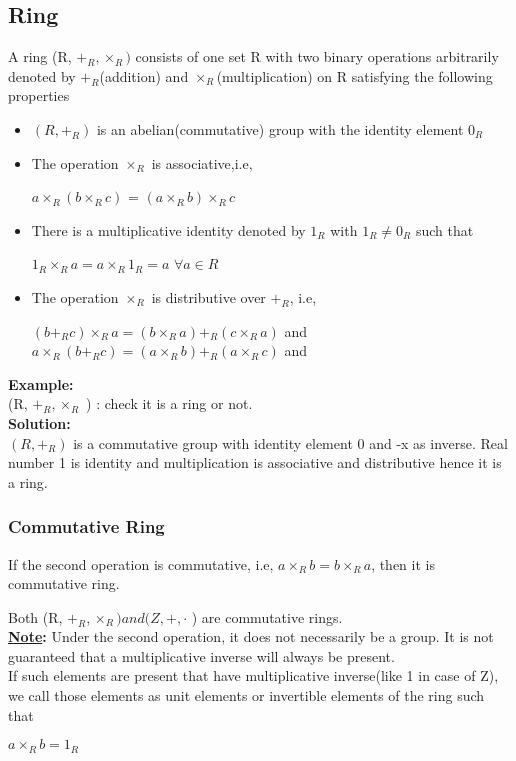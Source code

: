 \documentclass[11pt]{article}
\begin{document}
\subsection{Ring}
A ring (R, $+_R, \times_R)$ consists of one set R with two binary operations arbitrarily denoted by $+_R$(addition) and $ {\times}_R$(multiplication) on R satisfying the following properties
\begin{itemize}
    \item $(R, +_R)$ is an abelian(commutative) group with the identity element $0_R$
    \item The operation $\times_R$ is associative,i.e,
    \begin{center}
        $a \times_R (b \times_R c)$ = $(a \times_R b) \times_R c$
    \end{center}
    \item There is a multiplicative identity denoted by $1_R$ with $1_R \neq 0_R$ such that 
    \begin{center}
        $1_R \times_R a = a \times_R 1_R = a$ $ \forall a\in R$
    \end{center}
    \item The operation $\times_R$ is distributive over $+_R$, i.e,
    \begin{center}
        $(b+_Rc)\times_R a = (b\times_Ra) +_R (c\times_Ra)$ and\\
        $a\times_R(b+_Rc) = (a\times_Rb) +_R (a\times_Rc)$ and\\
    \end{center}
\end{itemize}
\textbf{Example:}\\
(R, $+_R, \times_R$ ) : check it is a ring or not.\\
\textbf{Solution:}\\
$(R, +_R)$ is a commutative group with identity element 0 and -x as inverse. Real number 1 is identity and multiplication is associative and distributive hence it is a ring.

\subsubsection{Commutative Ring}
If the second operation is commutative, i.e, $a\times_Rb = b\times_Ra$, then it is commutative ring.

Both (R, $+_R, \times_R ) and (Z, +, \cdot$ ) are commutative rings.\\
\vspace{3mm}
\textbf{\underline{Note}:} Under the second operation, it does not necessarily be a group. It is not guaranteed that a multiplicative inverse will always be present. \\
If such elements are present that have multiplicative inverse(like 1 in case of Z), we call those elements as unit elements or invertible elements of the ring such that
\begin{center}
    $a\times_Rb = 1_R$
\end{center}
\end{document}
